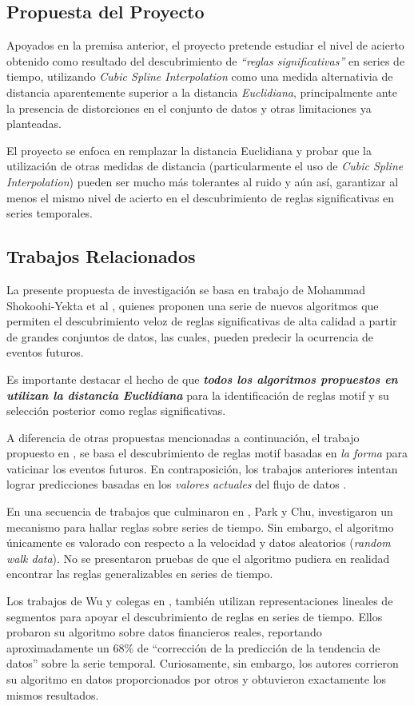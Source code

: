 \subsection{Propuesta del Proyecto}
Apoyados en la premisa anterior, el proyecto pretende estudiar el nivel de acierto obtenido como resultado del descubrimiento de \textit{\enquote{reglas significativas}} en series de tiempo, utilizando \textit{Cubic Spline Interpolation} como una medida alternativia de distancia aparentemente superior a la distancia \textit{Euclidiana}, principalmente ante la presen\-cia de distorciones en el conjunto de datos y otras limitaciones ya planteadas.\par
El proyecto se enfoca en remplazar la distancia Euclidiana y probar que la utilizaci\'on de otras medidas de distancia (particularmente el uso de \textit{Cubic Spline Interpolation}) pueden ser mucho m\'as tolerantes al ruido y a\'un as\'i, garantizar al menos el mismo nivel de acierto en el descubrimiento de reglas significativas en series temporales.
\subsection{Trabajos Relacionados}
La presente propuesta de investigaci\'on se basa en trabajo de Mohammad Shokoohi-Yekta et al \cite{main}, quienes proponen una serie de nuevos algoritmos que permiten el des\-cubrimiento veloz de reglas significativas de alta calidad a partir de grandes conjuntos de datos, las cuales, pueden predecir la ocurrencia de eventos futuros.\par
Es importante destacar el hecho de que \textit{\textbf{todos los algoritmos propuestos en \cite{main} utilizan la distancia Euclidiana}} para la identificaci\'on de reglas motif y su selecci\'on posterior como reglas significativas.\par
A diferencia de otras propuestas mencionadas a continuaci\'on, el trabajo propuesto en \cite{main}, se basa el descubrimiento de reglas motif basadas en \textit{la forma} para vaticinar los eventos futuros. En contraposici\'on, los trabajos anteriores intentan lograr predicciones basadas en los \textit{valores actuales} del flujo de datos \cite{others}.\par
En una secuencia de trabajos que culminaron en \cite{elasticrules}, Park y Chu, investigaron un mecanismo para hallar reglas sobre series de tiempo. Sin embargo, el algoritmo \'unicamente es valorado con respecto a la velocidad y datos aleatorios (\textit{random walk data}). No se presentaron pruebas de que el algoritmo pudiera en realidad encontrar las reglas generalizables en series de tiempo.\par
Los trabajos de Wu y colegas en \cite{eventdriven}, tambi\'en utilizan representaciones lineales de segmentos para apoyar el descubrimiento de reglas en series de tiempo. Ellos probaron su algoritmo sobre datos financieros reales, reportando aproximadamente un 68\% de \enquote{correcci\'on de la predicci\'on de la tendencia de datos} sobre la serie temporal. Curiosamente, sin embargo, los autores corrieron su algoritmo en datos proporcionados por otros y obtuvieron exactamente los mismos resultados.\par


